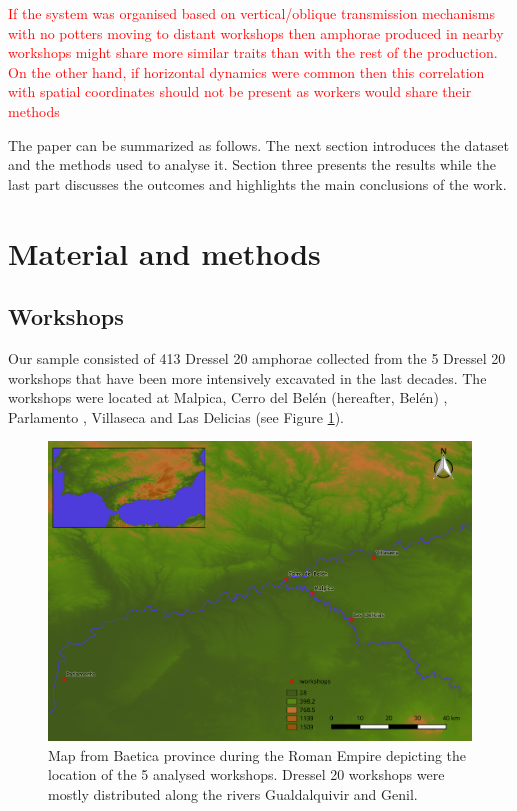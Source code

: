 \documentclass[review]{elsarticle}
\newcommand{\memo}[2]{\textcolor{#1}{#2}}
\newcommand{\maria}[1]{\memo{red}{#1\\}}
\begin{document}
\maria{If the system was organised based on vertical/oblique transmission mechanisms with no potters moving to distant workshops then amphorae produced in nearby workshops might share more similar traits than with the rest of the production. On the other hand, if horizontal dynamics were common then this correlation with spatial coordinates should not be present as workers would share their methods}

The paper can be summarized as follows. The next section introduces the dataset and the methods used to analyse it. Section three presents the results while the last part discusses the outcomes and highlights the main conclusions of the work. 

\section{Material and methods}

\subsection{Workshops}

Our sample consisted of 413 Dressel 20 amphorae collected from the 5 Dressel 20 workshops that have been more intensively excavated in the last decades. The workshops were located at Malpica, Cerro del Belén (hereafter, Belén) \citep{diaz_trujillo_excavacion_1992}, Parlamento \citep{garcia_vargas_anforas_2000}, Villaseca\citep{garcia_vargas_enrique_excavacion_????} and Las Delicias \citep{fernandez_excavacion_2001,_atelier_2014} (see Figure \ref{romanworkshop}).

\begin{figure}[htp]
	\centering
\includegraphics[width=\linewidth]{figs/romanworkshop}
\caption{Map from Baetica province during the Roman Empire depicting the location of the 5 analysed workshops. Dressel 20 workshops were mostly distributed along the rivers Gualdalquivir and Genil.}
\label{romanworkshop}
\end{figure} 
\end{document}
